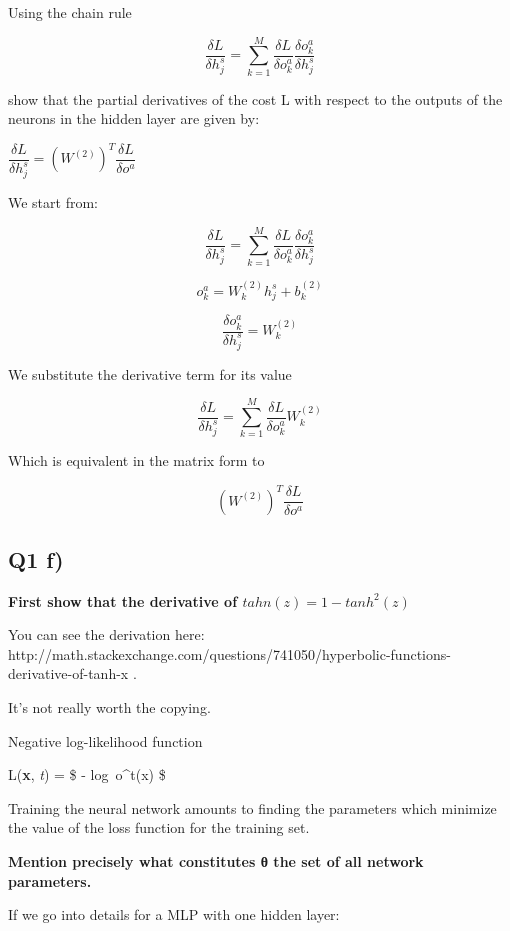 \documentclass{article}
\begin{document}
    Using the chain rule

\[ \dfrac {\delta L} {\delta h^s_j} = \sum \limits_{k=1}^M \dfrac {\delta L} {\delta o^a_k} \dfrac {\delta o^a_k} {\delta h^s_j}\]

show that the partial derivatives of the cost L with respect to the
outputs of the neurons in the hidden layer are given by:

$\dfrac {\delta L} {\delta h^s_j} = (W^{(2)})^T \dfrac {\delta L} {\delta o^a}$

We start from:

\[ \dfrac {\delta L} {\delta h^s_j} = \sum \limits_{k=1}^M \dfrac {\delta L} {\delta o^a_k} \dfrac {\delta o^a_k} {\delta h^s_j}\]

\[ o^a_k = W^{(2)}_k h^s_j + b^{(2)}_k\]

\[ \dfrac {\delta o^a_k} {\delta h^s_j} = W^{(2)}_k \]

We substitute the derivative term for its value

\[ \dfrac {\delta L} {\delta h^s_j} = \sum \limits_{k=1}^M \dfrac {\delta L} {\delta o^a_k}  W^{(2)}_k\]

Which is equivalent in the matrix form to

\[(W^{(2)})^T \dfrac {\delta L} {\delta o^a}\]

    \subsection{Q1 f)}\label{q1-f}

    \textbf{First show that the derivative of $tahn(z) = 1 - tanh^2(z)$}

You can see the derivation here:
http://math.stackexchange.com/questions/741050/hyperbolic-functions-derivative-of-tanh-x
.

It's not really worth the copying.

    

    

    

    

    Negative log-likelihood function

L(\textbf{x}, \emph{t}) = \$ - log~o\^{}t(x) \$

Training the neural network amounts to finding the parameters which
minimize the value of the loss function for the training set.

\textbf{Mention precisely what constitutes θ the set of all network
parameters.}

If we go into details for a MLP with one hidden layer:
\end{document}
